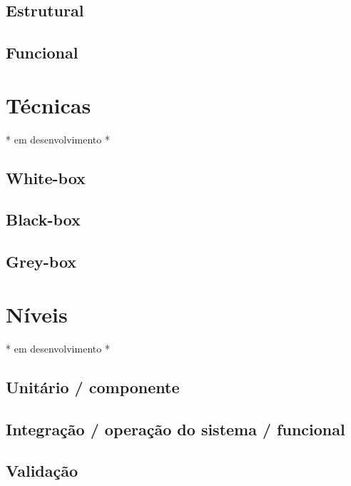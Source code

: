 \documentclass[
	12pt,				%
	openright,			%
	oneside,			%
	a4paper,			%
	english,			%
	brazil,				%
	]{abntex2}
\begin{document}
\subsection{Estrutural}

\subsection{Funcional}



\section{Técnicas}
* em desenvolvimento *

\subsection{White-box}

\subsection{Black-box}

\subsection{Grey-box}

\section{Níveis}
* em desenvolvimento *

\subsection{Unitário / componente}

\subsection{Integração / operação do sistema / funcional}

\subsection{Validação}
\end{document}
